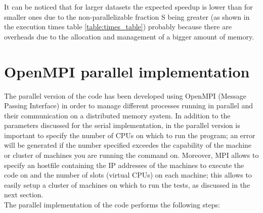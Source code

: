 \documentclass[final,5p,times,twocolumn,authoryear]{elsarticle}
\begin{document}
It can be noticed that for larger datasets the expected speedup is lower than for smaller ones due to the non-parallelizable fraction S being greater (as shown in the execution times table \ref{table:times_table}) probably because there are overheads due to the allocation and management of a bigger amount of memory.

\section{OpenMPI parallel implementation}
The parallel version of the code has been developed using OpenMPI (Message Passing Interface) in order to manage different processes running in parallel and their communication on a distributed memory system. In addition to the parameters discussed for the serial implementation, in the parallel version is important to specify the number of CPUs on which to run the program; an error will be generated if the number specified exceedes the capability of the machine or cluster of machines you are running the command on. Moreover, MPI allows to specify an hostfile containing the IP addresses of the machines to execute the code on and the number of slots (virtual CPUs) on each machine; this allows to easily setup a cluster of machines on which to run the tests, as discussed in the next section. \\
The parallel implementation of the code performs the following steps:
\end{document}
